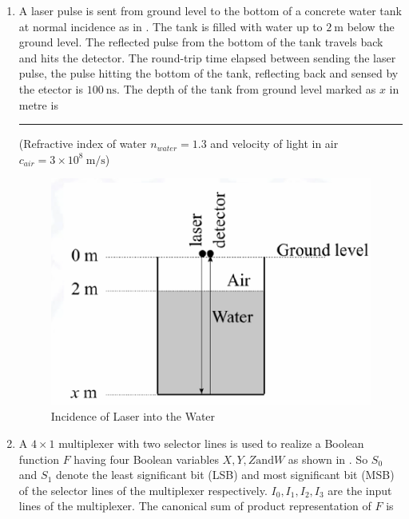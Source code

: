 \documentclass[journal,12pt,onecolumn]{IEEEtran}
\theoremstyle{remark}
\begin{document}
\begin{enumerate}
\item A laser pulse is sent from ground level to the bottom of a concrete water tank at normal incidence as in . The tank is filled with water up to $2\ \text{m}$ below the ground level. The reflected pulse from the bottom of the tank travels back and hits the detector. The round-trip time elapsed between sending the laser pulse, the pulse hitting the bottom of the tank, reflecting back and sensed by the  etector is $100\ \text{ns}$. The depth of the tank from ground level marked as $x$ in
metre is \rule{1.5cm}{0.4pt} (Refractive index of water $n_{water}=1.3$ and velocity of light in air $c_{air} = 3 \times 10^8\ \text{m/s}$) \par \hfill{}
\begin{figure}[H]
    \centering
    \includegraphics[width=0.5\linewidth]{Figs/Q-34.png}
    \caption{Incidence of Laser into the Water}
    \label{34}
\end{figure}
\begin{enumerate}[label=(\Alph*)]
\end{enumerate}

\item A $4 \times 1$ multiplexer with two selector lines is used to realize a Boolean function $F$ having four Boolean variables $X, Y, Z \text{and} W$ as shown in . So $S_0$ and $S_1$ denote the least significant bit (LSB) and most significant bit (MSB) of the selector lines of the multiplexer respectively. $I_0, I_1, I_2, I_3$ are the input lines of the multiplexer. The canonical sum of product representation of $F$ is \par \hfill{}


\end{enumerate}
\end{document}
